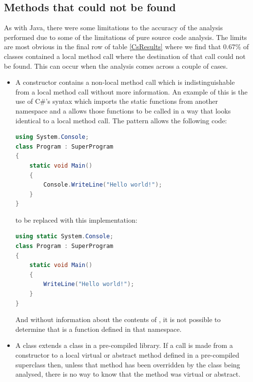 \subsection{Methods that could not be found}
\label{MethodNotFound}
As with Java, there were some limitations to the accuracy of the analysis performed due to some of the limitations of pure source code analysis. The limits are most obvious in the final row of table \ref{CsResults} where we find that 0.67\% of classes contained a local method call where the destination of that call could not be found. This can occur when the analysis comes across a couple of cases.
\begin{itemize}
	\item A constructor contains a non-local method call which is indistinguishable from a local method call without more information. An example of this is the use of C\#'s  syntax which imports the static functions from another namespace and a allows those functions to be called in a way that looks identical to a local method call. The  pattern allows the following code:
	\begin{lstlisting}[language=cs]
using System.Console;
class Program : SuperProgram
{ 
	static void Main() 
	{ 
		Console.WriteLine("Hello world!"); 
	} 
}
	\end{lstlisting}
	to be replaced with this implementation:
	\begin{lstlisting}[language=cs]
using static System.Console;
class Program : SuperProgram
{ 
	static void Main() 
	{ 
		WriteLine("Hello world!"); 
	} 
}
	\end{lstlisting}
	And without information about the contents of , it is not possible to determine that  is a function defined in that namespace.
	\item A class extends a class in a pre-compiled library. If a call is made from a constructor to a local virtual or abstract method defined in a pre-compiled superclass then, unless that method has been overridden by the class being analysed, there is no way to know that the method was virtual or abstract.
\end{itemize}

